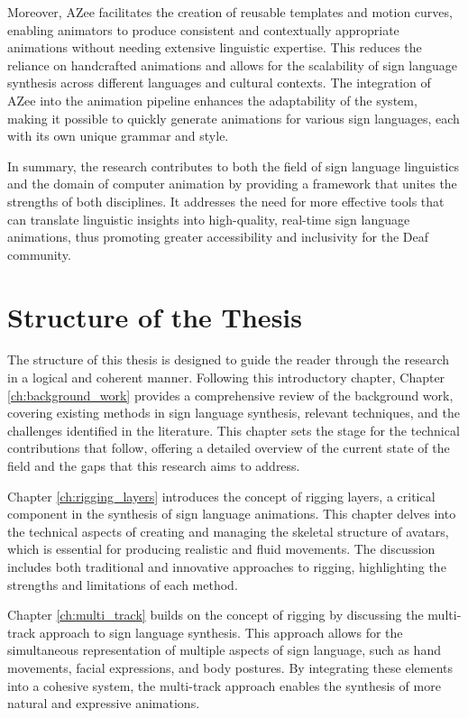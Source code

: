 \documentclass[../../main.tex]{subfiles}
\begin{document}
Moreover, AZee facilitates the creation of reusable templates and motion curves, enabling animators to produce consistent and contextually appropriate animations without needing extensive linguistic expertise. This reduces the reliance on handcrafted animations and allows for the scalability of sign language synthesis across different languages and cultural contexts. The integration of AZee into the animation pipeline enhances the adaptability of the system, making it possible to quickly generate animations for various sign languages, each with its own unique grammar and style.

In summary, the research contributes to both the field of sign language linguistics and the domain of computer animation by providing a framework that unites the strengths of both disciplines. It addresses the need for more effective tools that can translate linguistic insights into high-quality, real-time sign language animations, thus promoting greater accessibility and inclusivity for the Deaf community.

\section{Structure of the Thesis}

The structure of this thesis is designed to guide the reader through the research in a logical and coherent manner. Following this introductory chapter, Chapter \ref{ch:background_work} provides a comprehensive review of the background work, covering existing methods in sign language synthesis, relevant techniques, and the challenges identified in the literature. This chapter sets the stage for the technical contributions that follow, offering a detailed overview of the current state of the field and the gaps that this research aims to address.

Chapter \ref{ch:rigging_layers} introduces the concept of rigging layers, a critical component in the synthesis of sign language animations. This chapter delves into the technical aspects of creating and managing the skeletal structure of avatars, which is essential for producing realistic and fluid movements. The discussion includes both traditional and innovative approaches to rigging, highlighting the strengths and limitations of each method.

Chapter \ref{ch:multi_track} builds on the concept of rigging by discussing the multi-track approach to sign language synthesis. This approach allows for the simultaneous representation of multiple aspects of sign language, such as hand movements, facial expressions, and body postures. By integrating these elements into a cohesive system, the multi-track approach enables the synthesis of more natural and expressive animations.
\end{document}
